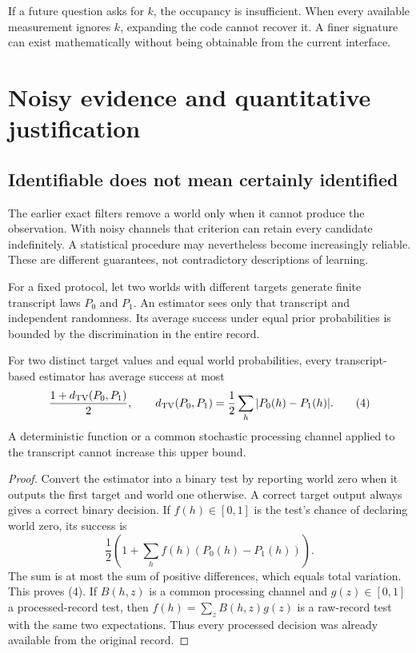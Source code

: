 If a future question asks for $k$, the occupancy is insufficient. When every available measurement ignores $k$, expanding the code cannot recover it. A finer signature can exist mathematically without being obtainable from the current interface.

\FloatBarrier
\chapter{Noisy evidence and quantitative justification}\label{GA:book:chapter-27}

\section{Identifiable does not mean certainly identified}\label{GA:sec:noise}
The earlier exact filters remove a world only when it cannot produce the observation. With noisy channels that criterion can retain every candidate indefinitely. A statistical procedure may nevertheless become increasingly reliable. These are different guarantees, not contradictory descriptions of learning.

For a fixed protocol, let two worlds with different targets generate finite transcript laws $P_0$ and $P_1$. An estimator sees only that transcript and independent randomness. Its average success under equal prior probabilities is bounded by the discrimination in the entire record.

\begin{GAproposition}\label{GA:prop:testing}
For two distinct target values and equal world probabilities, every transcript-based estimator has average success at most
\[
\frac{1+d_{\mathrm{TV}}(P_0,P_1)}{2},\qquad
d_{\mathrm{TV}}(P_0,P_1)=\frac12\sum_h|P_0(h)-P_1(h)|.\tag{4}
\]
A deterministic function or a common stochastic processing channel applied to the transcript cannot increase this upper bound.
\end{GAproposition}
\begin{proof}
Convert the estimator into a binary test by reporting world zero when it outputs the first target and world one otherwise. A correct target output always gives a correct binary decision. If $f(h)\in[0,1]$ is the test's chance of declaring world zero, its success is
\[
\frac12\left(1+\sum_h f(h)(P_0(h)-P_1(h))\right).
\]
The sum is at most the sum of positive differences, which equals total variation. This proves (4). If $B(h,z)$ is a common processing channel and $g(z)\in[0,1]$ a processed-record test, then $f(h)=\sum_zB(h,z)g(z)$ is a raw-record test with the same two expectations. Thus every processed decision was already available from the original record.
\end{proof}

